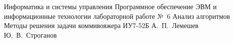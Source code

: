 \makereporttitle
    {Информатика и системы управления}
    {Программное обеспечение ЭВМ и информационные технологии}
    {лабораторной работе №~6}
    {Анализ алгоритмов}
    {Методы решения задачи коммивояжера}
    {}
    {ИУ7-52Б}
    {А.~П.~Лемешев}
    {Ю.~В.~Строганов}
    {}

